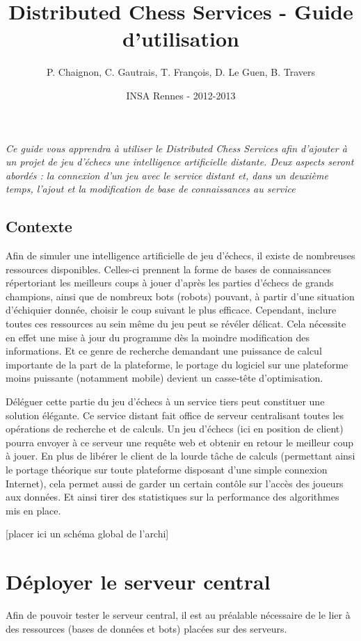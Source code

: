 \documentclass[a4paper,11pt]{report}
\title{Distributed Chess Services - Guide d'utilisation}
\author{P. Chaignon, C. Gautrais, T. François, D. Le Guen, B. Travers}
\date{INSA Rennes - 2012-2013}
\begin{document}
\maketitle{}

{\em Ce guide vous apprendra à utiliser le Distributed Chess Services afin d'ajouter à un projet de jeu d'échecs une intelligence artificielle distante. Deux aspects seront abordés : la connexion d'un jeu avec le service distant et, dans un deuxième temps, l'ajout et la modification de base de connaissances au service}


\section*{Contexte}
        Afin de simuler une intelligence artificielle de jeu d'échecs, il existe de nombreuses ressources disponibles. Celles-ci prennent la forme de bases de connaissances répertoriant les meilleurs coups à jouer d'après les parties d'échecs de grands champions, ainsi que de nombreux bots (robots) pouvant, à partir d'une situation d'échiquier donnée, choisir le coup suivant le plus efficace. Cependant, inclure toutes ces ressources au sein même du jeu peut se révéler délicat. Cela nécessite en effet une mise à jour du programme dès la moindre modification des informations. Et ce genre de recherche demandant une puissance de calcul importante de la part de la plateforme, le portage du logiciel sur une plateforme moins puissante (notamment mobile) devient un casse-tête d'optimisation.
        
        Déléguer cette partie du jeu d'échecs à un service tiers peut constituer une solution élégante. Ce service distant fait office de serveur centralisant toutes les opérations de recherche et de calculs. Un jeu d'échecs (ici en position de client) pourra envoyer à ce serveur une requête web et obtenir en retour le meilleur coup à jouer. En plus de libérer le client de la lourde tâche de calculs (permettant ainsi le portage théorique sur toute plateforme disposant d'une simple connexion Internet), cela permet aussi de garder un certain contôle sur l'accès des joueurs aux données. Et ainsi tirer des statistiques sur la performance des algorithmes mis en place.

[placer ici un schéma global de l’archi]


\chapter{Déployer le serveur central}
		Afin de pouvoir tester le serveur central, il est au préalable nécessaire de le lier à des ressources (bases de données et bots) placées sur des serveurs.
\end{document}
